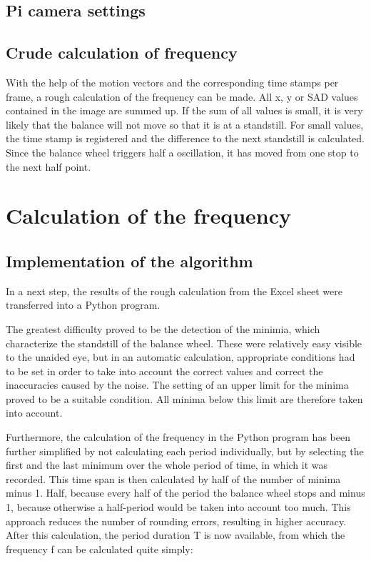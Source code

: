 \documentclass[12pt, a4paper]{report}
\begin{document}
\bigskip

\section{Pi camera settings}

\section{Crude calculation of frequency}
With the help of the motion vectors and the corresponding time stamps per frame, a rough calculation of the frequency can be made.
All x, y or SAD values contained in the image are summed up. If the sum of all values is small, it is very likely that the balance will not move so that it is at a standstill.
For small values, the time stamp is registered and the difference to the next standstill is calculated.
Since the balance wheel triggers half a oscillation, it has moved from one stop to the next half point. 
 
\chapter{Calculation of the frequency}

\section{Implementation of the algorithm}

In a next step, the results of the rough calculation from the Excel sheet were transferred into a Python program. 

The greatest difficulty proved to be the detection of the minimia, which characterize the standstill of the balance wheel. These were relatively easy visible to the unaided eye, but in an automatic calculation, appropriate conditions had to be set in order to take into account the correct values and correct the inaccuracies caused by the noise. The setting of an upper limit for the minima proved to be a suitable condition. All minima below this limit are therefore taken into account. 

Furthermore, the calculation of the frequency in the Python program has been further simplified by not calculating each period individually, but by selecting the first and the last minimum over the whole period of time, in which it was recorded. This time span is then calculated by half of the number of minima minus 1. Half, because every half of the period the balance wheel stops and minus 1, because otherwise a half-period would be taken into account too much. This approach reduces the number of rounding errors, resulting in higher accuracy. After this calculation, the period duration T is now available, from which the frequency f can be calculated quite simply: 
\end{document}
